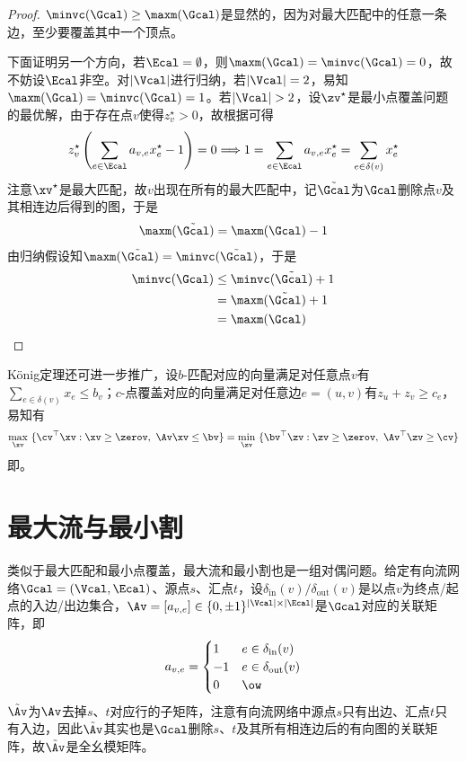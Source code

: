 \documentclass{ctexart}
\begin{document}
\begin{proof}
    $\minvc(\Gcal) \ge \maxm(\Gcal)$是显然的，因为对最大匹配中的任意一条边，至少要覆盖其中一个顶点。

    下面证明另一个方向，若$\Ecal = \emptyset$，则$\maxm(\Gcal) = \minvc(\Gcal) = 0$，故不妨设$\Ecal$非空。对$|\Vcal|$进行归纳，若$|\Vcal| = 2$，易知$\maxm(\Gcal) = \minvc(\Gcal) = 1$。若$|\Vcal| > 2$，设$\zv^\star$是最小点覆盖问题的最优解，由于存在点$v$使得$z_v^\star > 0$，故根据可得
    \begin{align*}
        z_v^\star \left( \sum_{e \in \Ecal} a_{v,e} x_e^\star - 1 \right) = 0 \Longrightarrow 1 = \sum_{e \in \Ecal} a_{v,e} x_e^\star = \sum_{e \in \delta(v)} x_e^\star
    \end{align*}
    注意$\xv^\star$是最大匹配，故$v$出现在所有的最大匹配中，记$\tilde{\Gcal}$为$\Gcal$删除点$v$及其相连边后得到的图，于是
    \begin{align*}
        \maxm(\tilde{\Gcal}) = \maxm(\Gcal) - 1
    \end{align*}
    由归纳假设知$\maxm(\tilde{\Gcal}) = \minvc(\tilde{\Gcal})$，于是
    \begin{align*}
        \minvc(\Gcal) & \le \minvc(\tilde{\Gcal}) + 1 \\
                      & = \maxm(\tilde{\Gcal}) + 1    \\
                      & = \maxm(\Gcal)
    \end{align*}
\end{proof}

König定理还可进一步推广，设$b$-匹配对应的向量满足对任意点$v$有$\sum_{e \in \delta(v)} x_e \le b_v$；$c$-点覆盖对应的向量满足对任意边$e = (u,v)$有$z_u + z_v \ge c_e$，易知有
\begin{align*}
    \max_{\xv} ~ \{ \cv^\top \xv : \xv \ge \zerov, ~ \Av \xv \le \bv \} = \min_{\zv} ~ \{ \bv^\top \zv : \zv \ge \zerov, ~ \Av^\top \zv \ge \cv \}
\end{align*}
即。

\section{最大流与最小割}

类似于最大匹配和最小点覆盖，最大流和最小割也是一组对偶问题。给定有向流网络$\Gcal = (\Vcal, \Ecal)$、源点$s$、汇点$t$，设$\delta_{\text{in}}(v) / \delta_{\text{out}}(v)$是以点$v$为终点/起点的入边/出边集合，$\Av = [a_{v,e}] \in \{ 0, \pm 1 \}^{|\Vcal| \times |\Ecal|}$是$\Gcal$对应的关联矩阵，即
\begin{align*}
    a_{v,e} = \begin{cases}
                  1  & e \in \delta_{\text{in}} (v)  \\
                  -1 & e \in \delta_{\text{out}} (v) \\
                  0  & \ow
              \end{cases}
\end{align*}
$\tilde{\Av}$为$\Av$去掉$s$、$t$对应行的子矩阵，注意有向流网络中源点$s$只有出边、汇点$t$只有入边，因此$\tilde{\Av}$其实也是$\Gcal$删除$s$、$t$及其所有相连边后的有向图的关联矩阵，故$\tilde{\Av}$是全幺模矩阵。
\end{document}

